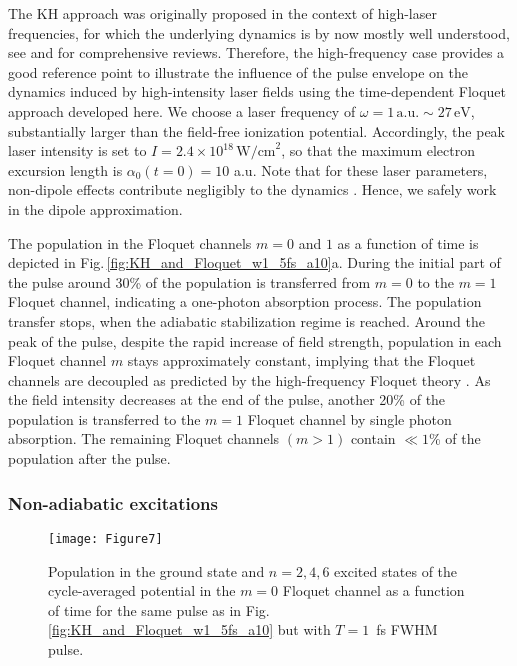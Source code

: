 \documentclass[
pra%
,preprint%
,amssymb, nobibnotes, aps, superscriptaddress, floatfix]{revtex4}
\newcommand{\fig}{Fig.\,}
\newcommand{\as}{\alpha}
\begin{document}
The KH approach was originally proposed in the context of high-laser frequencies, for which the underlying dynamics is by now mostly well understood, see \cite{Gavrila2002} and \cite{Popov2003} for comprehensive reviews. Therefore, the high-frequency case provides a good reference point to illustrate the influence of the pulse envelope on the dynamics induced by high-intensity laser fields using the time-dependent Floquet approach developed here. We choose a laser frequency of $\omega = 1 \, \text{a.u.} \sim 27 \, \text{eV}$, substantially larger than the field-free ionization potential. Accordingly, the peak laser intensity is set to $I=2.4 \times 10^{18} \, \text{W/cm}^2$, so that the maximum electron excursion length is $\as_0(t=0)=10$ a.u. Note that for these laser parameters, non-dipole effects contribute negligibly to the dynamics \cite{Førre2005}. Hence, we safely work in the dipole approximation.

The population in the Floquet channels $m=0$ and $1$ as a function of time is depicted in \fig \ref{fig:KH_and_Floquet_w1_5fs_a10}a. During the initial part of the pulse around 30\% of the population is transferred from $m=0$ to the $m=1$ Floquet channel, indicating a one-photon absorption process. The population transfer stops, when the adiabatic stabilization regime is reached. Around the peak of the pulse, despite the rapid increase of field strength, population in each Floquet channel $m $ stays approximately constant, implying that the Floquet channels are decoupled as predicted by the high-frequency Floquet theory \cite{Marinescu1996}. As the field intensity decreases at the end of the pulse, another 20\% of the population is transferred to the $m=1$ Floquet channel by single photon absorption. The remaining Floquet channels $(m>1)$ contain $\ll 1$\% of the population after the pulse. 

\subsubsection{Non-adiabatic excitations}

\begin{figure}
\centering
\texttt{[image: Figure7]}
\caption{Population in the ground state and $n=2, 4, 6$ excited states of the cycle-averaged potential in the $m=0$ Floquet channel as a function of time for the same pulse as in \fig \ref{fig:KH_and_Floquet_w1_5fs_a10} but with $T=1$~fs FWHM pulse.}
\label{fig:KH_w1_1fs_a10}
\end{figure}
\end{document}
